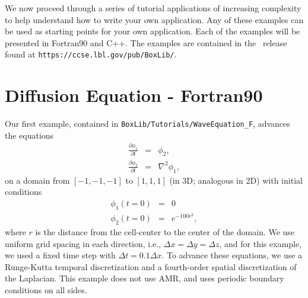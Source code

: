 We now proceed through a series of tutorial applications of increasing complexity
to help understand how to write your own application.  Any of these examples
can be used as starting points for your own application.  Each of the examples
will be presented in Fortran90 and C++.  The examples are contained in the \BoxLib\
release found at {\tt https://ccse.lbl.gov/pub/BoxLib/}.

\section{Diffusion Equation - Fortran90}
Our first example, contained in {\tt BoxLib/Tutorials/WaveEquation\_F}, advances the equations
\begin{eqnarray}
\frac{\partial\phi_1}{\partial t} &=& \phi_2, \\
\frac{\partial\phi_2}{\partial t} &=& \nabla^2\phi_1,
\end{eqnarray}
on a domain from $[-1,-1,-1]$ to $[1,1,1]$ (in 3D; analogous in 2D) with initial conditions
\begin{eqnarray}
\phi_1(t=0) &=& 0 \\
\phi_2(t=0) &=& e^{-100r^2},
\end{eqnarray}
where $r$ is the distance from the cell-center to the center of the domain.
We use uniform grid spacing in each direction, i.e., $\Delta x = \Delta y = \Delta z$,
and for this example, we used a fixed time step with $\Delta t = 0.1\Delta x$.
To advance these equations, we use a Runge-Kutta temporal discretization and a 
fourth-order spatial discretization of the Laplacian.  This example does not use AMR, 
and uses periodic boundary conditions on all sides.

